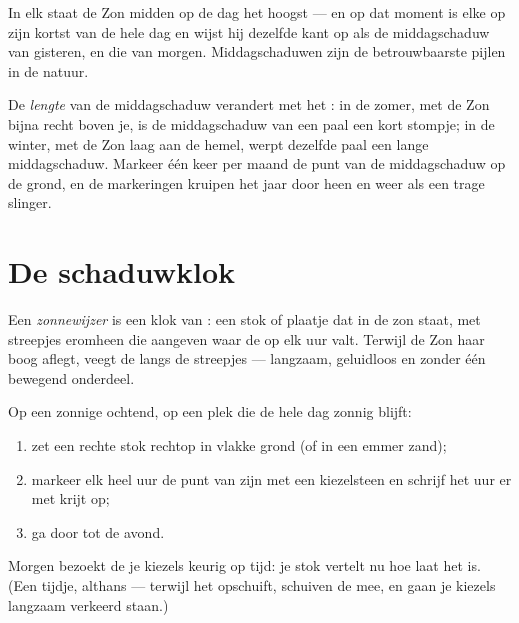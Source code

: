 \begin{proposition}[De middagregel]\label{prop:g3:sun-days-seasons:midday}
In elk  staat de Zon midden op de dag het hoogst --- en op dat
moment is elke  op zijn kortst van de hele dag en wijst hij
dezelfde kant op als de middagschaduw van gisteren, en die van morgen.
Middagschaduwen zijn de betrouwbaarste pijlen in de natuur.
\end{proposition}

\begin{example}\label{ex:g3:sun-days-seasons:shadowlength}
De \emph{lengte} van de middagschaduw verandert met het : in de
zomer, met de Zon bijna recht boven je, is de middagschaduw van een
paal een kort stompje; in de winter, met de Zon laag aan de hemel,
werpt dezelfde paal een lange middagschaduw. Markeer één keer per maand
de punt van de middagschaduw op de grond, en de markeringen kruipen
het jaar door heen en weer als een trage slinger.
\end{example}

\section{De schaduwklok}

\begin{definition}[Zonnewijzer]\label{def:g3:sun-days-seasons:sundial}
Een \emph{zonnewijzer} is een klok van
: een stok of plaatje dat in de zon staat, met streepjes
eromheen die aangeven waar de  op elk uur valt. Terwijl de Zon
haar boog aflegt, veegt de  langs de streepjes --- langzaam,
geluidloos en zonder één bewegend onderdeel.
\end{definition}

\begin{method}\label{met:g3:sun-days-seasons:build}
Op een zonnige ochtend, op een plek die de hele dag zonnig blijft:
\begin{enumerate}
  \item zet een rechte stok rechtop in vlakke grond (of in een emmer
        zand);
  \item markeer elk heel uur de punt van zijn  met een
        kiezelsteen en schrijf het uur er met krijt op;
  \item ga door tot de avond.
\end{enumerate}
Morgen bezoekt de  je kiezels keurig op tijd: je stok vertelt nu
hoe laat het is. (Een tijdje, althans --- terwijl het 
opschuift, schuiven de  mee, en gaan je kiezels langzaam
verkeerd staan.)
\end{method}

